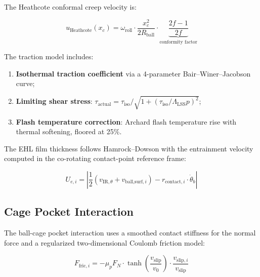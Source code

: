 \documentclass[machines,article,submit,pdftex,moreauthors]{Definitions/mdpi}
\begin{document}
The Heathcote conformal creep velocity is:

\begin{linenomath}
\begin{equation}
    u_{\text{Heathcote}}(x_c) = \omega_{\text{roll}} \cdot \frac{x_c^2}{2R_{\text{ball}}} \cdot \underbrace{\frac{2f - 1}{2f}}_{\text{conformity factor}}
    \label{eq:heathcote}
\end{equation}
\end{linenomath}

The traction model includes:
\begin{enumerate}
    \item \textbf{Isothermal traction coefficient} via a 4-parameter Bair--Winer--Jacobson curve;
    \item \textbf{Limiting shear stress}: $\tau_{\text{actual}} = \tau_{\text{iso}} / \sqrt{1 + (\tau_{\text{iso}}/\Lambda_{\text{LSS}} p)^2}$;
    \item \textbf{Flash temperature correction}: Archard flash temperature rise with thermal softening, floored at 25\%.
\end{enumerate}

The EHL film thickness follows Hamrock--Dowson with the entrainment velocity computed in the co-rotating contact-point reference frame:

\begin{linenomath}
\begin{equation}
    U_{e,i} = \left|\frac{1}{2}(v_{\text{IR},\theta} + v_{\text{ball,surf},i}) - r_{\text{contact},i} \cdot \dot{\theta}_b\right|
    \label{eq:entrain_corotating}
\end{equation}
\end{linenomath}


\subsection{Cage Pocket Interaction}
\label{sec:cage}

The ball-cage pocket interaction uses a smoothed contact stiffness for the normal force and a regularized two-dimensional Coulomb friction model:

\begin{linenomath}
\begin{equation}
    F_{\text{fric},i} = -\mu_p F_N \cdot \tanh\!\left(\frac{v_{\text{slip}}}{v_0}\right) \cdot \frac{v_{\text{slip},i}}{v_{\text{slip}}}
    \label{eq:coulomb_2d}
\end{equation}
\end{linenomath}
\end{document}

